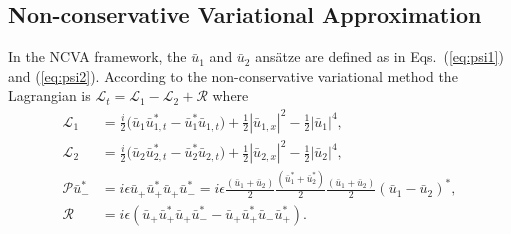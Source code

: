 \subsection{Non-conservative Variational Approximation} \label{section:DD}
In the NCVA framework, the $\bar{u}_1$ and $\bar{u}_2$ ans\"{a}tze are defined as in Eqs.~(\ref{eq:psi1}) and (\ref{eq:psi2}).
According to the non-conservative variational method the Lagrangian is $\mathcal{L}_t = \mathcal{L}_1 - \mathcal{L}_2 + \mathcal{R}$ where 
\begin{align}
\mathcal{L}_1 &= \frac{i}{2} \Big(\bar{u}_1 \bar{u}_{1,t}^* - \bar{u}_1^* \bar{u}_{1,t}\Big) + \frac{1}{2} |\bar{u}_{1,x}|^2 - \frac{1}{2}|\bar{u}_1|^4, \\
\mathcal{L}_2 &= \frac{i}{2} \Big(\bar{u}_2 \bar{u}_{2,t}^* - \bar{u}_2^* \bar{u}_{2,t}\Big) + \frac{1}{2} |\bar{u}_{2,x}|^2 - \frac{1}{2}|\bar{u}_2|^4, \\
\mathcal{P} \bar{u}_-^* &=  i\epsilon  \bar{u}_+ \bar{u}_+^* \bar{u}_+\bar{u}_-^* =  i \epsilon  \frac{(\bar{u}_1 + \bar{u}_2)}{2}\frac{(\bar{u}_1^* + \bar{u}_2^*)}{2}\frac{(\bar{u}_1 + \bar{u}_2)}{2}(\bar{u}_1 - \bar{u}_2)^*, \\
\mathcal{R} & =  i\epsilon ( \bar{u}_+ \bar{u}_+^* \bar{u}_+\bar{u}_-^* -  \bar{u}_+ \bar{u}_+^* \bar{u}_-\bar{u}_+^*).  
\end{align}
